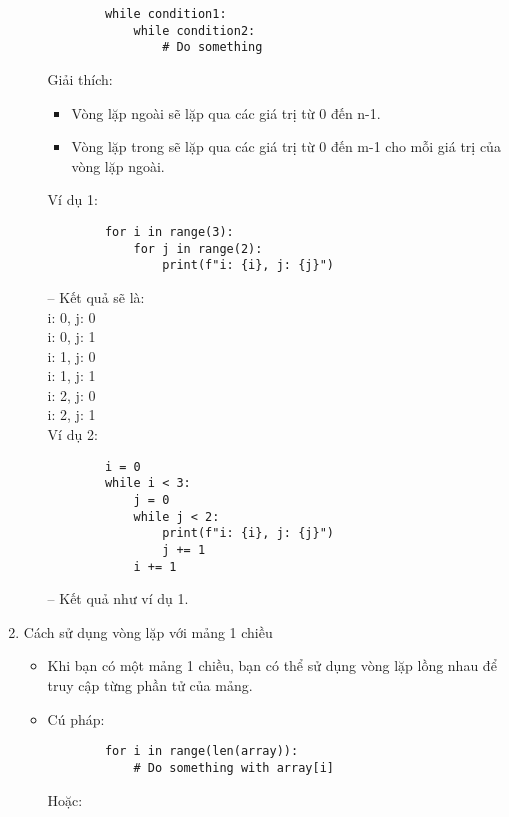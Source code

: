 \begin{enumerate}[label=\alph*.]
\begin{itemize}
        \begin{lstlisting}
        while condition1:
            while condition2:
                # Do something
        \end{lstlisting}
        \vspace{-4.5em}
        Giải thích:
        \begin{itemize}
            \item Vòng lặp ngoài sẽ lặp qua các giá trị từ 0 đến n-1.
            \item Vòng lặp trong sẽ lặp qua các giá trị từ 0 đến m-1 cho mỗi giá trị của vòng lặp ngoài.
        \end{itemize}
        Ví dụ 1:
        \begin{lstlisting}
        for i in range(3):
            for j in range(2):
                print(f"i: {i}, j: {j}")
        \end{lstlisting}
        \vspace{-4.5em}
        -- Kết quả sẽ là:\\
        i: 0, j: 0\\
        i: 0, j: 1\\
        i: 1, j: 0\\
        i: 1, j: 1\\
        i: 2, j: 0\\
        i: 2, j: 1\\
        Ví dụ 2:
        \begin{lstlisting}
        i = 0
        while i < 3:
            j = 0
            while j < 2:
                print(f"i: {i}, j: {j}")
                j += 1
            i += 1
        \end{lstlisting}
        \vspace{-4.5em}
        -- Kết quả như ví dụ 1.
    \end{itemize}
    \item Cách sử dụng vòng lặp với mảng 1 chiều
    \begin{itemize}
        \item Khi bạn có một mảng 1 chiều, bạn có thể sử dụng vòng lặp lồng nhau để truy cập từng phần tử của mảng.
        \item Cú pháp:
        \begin{lstlisting}
        for i in range(len(array)):
            # Do something with array[i]
        \end{lstlisting}
        \vspace{-4.5em}
        Hoặc:
        \begin{lstlisting}

\end{lstlisting}
\end{itemize}
\end{enumerate}
